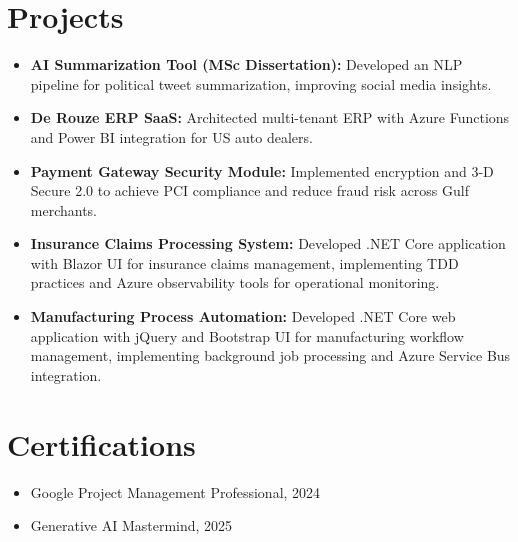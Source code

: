 \documentclass[letterpaper,10pt]{article}
\begin{document}
\section{Projects}
\begin{itemize}
    \setlength\itemsep{3pt}
    \item \textbf{AI Summarization Tool (MSc Dissertation):} Developed an NLP pipeline for political tweet summarization, improving social media insights.
    \item \textbf{De Rouze ERP SaaS:} Architected multi-tenant ERP with Azure Functions and Power BI integration for US auto dealers.
    \item \textbf{Payment Gateway Security Module:} Implemented encryption and 3-D Secure 2.0 to achieve PCI compliance and reduce fraud risk across Gulf merchants.
    \item \textbf{Insurance Claims Processing System:} Developed .NET Core application with Blazor UI for insurance claims management, implementing TDD practices and Azure observability tools for operational monitoring.
    \item \textbf{Manufacturing Process Automation:} Developed .NET Core web application with jQuery and Bootstrap UI for manufacturing workflow management, implementing background job processing and Azure Service Bus integration.
\end{itemize}

\section{Certifications}
\begin{itemize}
    \item Google Project Management Professional, 2024
    \item Generative AI Mastermind, 2025
\end{itemize}

\vspace*{\fill}
\end{document}
